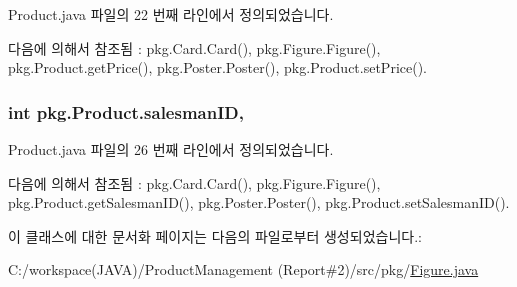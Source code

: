 Product.\+java 파일의 22 번째 라인에서 정의되었습니다.



다음에 의해서 참조됨 \+:  pkg.\+Card.\+Card(), pkg.\+Figure.\+Figure(), pkg.\+Product.\+get\+Price(), pkg.\+Poster.\+Poster(), pkg.\+Product.\+set\+Price().

\subsubsection[{\texorpdfstring{salesman\+ID}{salesmanID}}]{\setlength{\rightskip}{0pt plus 5cm}int pkg.\+Product.\+salesman\+ID\hspace{0.3cm}{\ttfamily [protected]}, {\ttfamily [inherited]}}\hypertarget{classpkg_1_1_product_aecf411b201022fca17571e9afbc76747}{}\label{classpkg_1_1_product_aecf411b201022fca17571e9afbc76747}


Product.\+java 파일의 26 번째 라인에서 정의되었습니다.



다음에 의해서 참조됨 \+:  pkg.\+Card.\+Card(), pkg.\+Figure.\+Figure(), pkg.\+Product.\+get\+Salesman\+I\+D(), pkg.\+Poster.\+Poster(), pkg.\+Product.\+set\+Salesman\+I\+D().



이 클래스에 대한 문서화 페이지는 다음의 파일로부터 생성되었습니다.\+:\begin{DoxyCompactItemize}
\item 
C\+:/workspace(\+J\+A\+V\+A)/\+Product\+Management (\+Report\#2)/src/pkg/\hyperlink{_figure_8java}{Figure.\+java}\end{DoxyCompactItemize}
